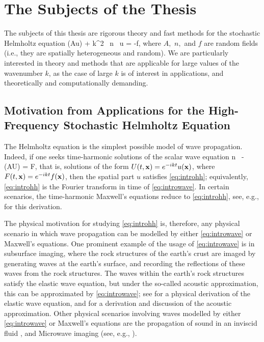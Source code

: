 \section{The Subjects of the Thesis}
The subjects of this thesis are rigorous theory and fast methods for the stochastic Helmholtz equation
\beq\label{eq:introhh}
\grad \cdot \mleft(A\grad u\mright) + k^2 \, n \, u = -f,
\eeq
where $A,$ $n,$ and $f$ are random fields (i.e., they are spatially heterogeneous and random). We are particularly interested in theory and methods that are applicable for large values of the wavenumber $k$, as the case of large $k$ is of interest in applications, and theoretically and computationally demanding.

\subsection{Motivation from Applications for the High-Frequency Stochastic Helmholtz Equation}\label{sec:motivapp}

The Helmholtz equation is the simplest possible model of wave propagation. Indeed, if one seeks time-harmonic solutions of the scalar wave equation
\beq\label{eq:introwave}
n \,  - \grad \cdot\mleft(A\grad U\mright) = F,
\eeq
that is, solutions of the form $U(t,\mathbf{x}) = e^{-ikt}u(\mathbf{x})$, where $F(t,\mathbf{x}) = e^{-ikt}f(\mathbf{x})$, then the spatial part $u$ satisfies \eqref{eq:introhh}; equivalently, \eqref{eq:introhh} is the Fourier transform in time  of \eqref{eq:introwave}. In certain scenarios, the time-harmonic Maxwell's equations reduce to \eqref{eq:introhh}, see, e.g., \cite[Remark 2.1]{MoSp:19} for this derivation.

The physical motivation for studying \eqref{eq:introhh} is, therefore, any physical scenario in which wave propagation can be modelled by either \eqref{eq:introwave} or Maxwell's equations. One prominent example of the usage of \eqref{eq:introwave} is in subsurface imaging, where the rock structures of the earth's crust are imaged by generating waves at the earth's surface, and recording the reflections of these waves from the rock structures. The waves within the earth's rock structures satisfy the elastic wave equation, but under the so-called acoustic approximation, this can be approximated by \eqref{eq:introwave}; see \cite[Section 1.2]{Ch:15} for a physical derivation of the elastic wave equation, and \cite[Section 1.2.6]{Ch:15} for a derivation and discussion of the acoustic approximation. Other physical scenarios involving waves modelled by either \eqref{eq:introwave} or Maxwell's equations are the propagation of sound in an inviscid fluid \cite[Section 2.1]{CoKr:13}, and Microwave imaging (see, e.g., \cite[Section 6.4]{BoDoGrSpTo:19}).

